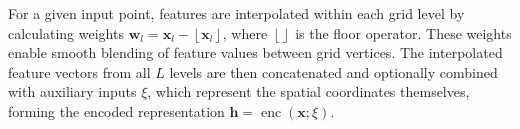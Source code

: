 \documentclass[AMA,STIX2COL]{MRM}
\begin{document}
For a given input point, features are interpolated within each grid level by calculating weights 
$\mathbf{w}_l=\mathbf{x}_l-\left\lfloor\mathbf{x}_l\right\rfloor$, where $\left\lfloor \right\rfloor$ is the floor operator. These weights enable smooth blending of feature values between grid vertices. The interpolated feature vectors from all $L$ levels are then concatenated and optionally combined with auxiliary inputs $\xi$, which represent the spatial coordinates themselves, forming the encoded representation $\mathbf{h}=\operatorname{enc}(\mathbf{x} ; \xi)$.


\end{document}
